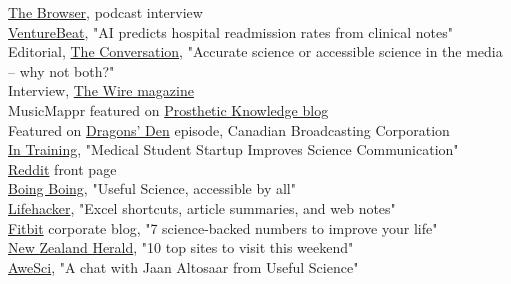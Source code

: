 \documentclass[4pt, letterpaper]{article}
\begin{document}
\href{https://radiobrowser.libsyn.com/browser-conversations-katy-gero-and-jaan-altosaar}{The Browser}, podcast interview\\
\href{https://venturebeat.com/2019/04/11/ai-predicts-hospital-readmission-rates-from-clinical-notes/}{VentureBeat}, "AI predicts hospital readmission rates from clinical notes"\\
Editorial, \href{https://theconversation.com/accurate-science-or-accessible-science-in-the-media-why-not-both-59871}{The Conversation}, "Accurate science or accessible science in the media – why not both?" \\
Interview, \href{http://www.thewire.co.uk/in-writing/interviews/play-the-musicmappr-sampling-app}{The Wire magazine}\\
MusicMappr featured on \href{http://prostheticknowledge.tumblr.com/post/139503874331/musicmappr-online-app-by-ethan-benjamin-analyzes-a}{Prosthetic Knowledge blog} \\
Featured on \href{http://www.cbc.ca/dragonsden/nextgenden/season1/next-gen-den-5}{Dragons' Den} episode, Canadian Broadcasting Corporation\\ %
\href{http://in-training.org/useful-science-medical-student-startup-improves-science-communication-9431}{In Training}, "Medical Student Startup Improves Science Communication"\\
\href{http://www.reddit.com/r/science/comments/2kbol2/commuters_became_happier_after_engaging_in/}{Reddit} front page\\
\href{http://boingboing.net/2014/01/22/useful-science-accessible-by.html}{Boing Boing}, "Useful Science, accessible by all"\\
\href{http://lifehacker.com/excel-shortcuts-article-summaries-and-web-notes-1506962447}{Lifehacker}, "Excel shortcuts, article summaries, and web notes"\\
\href{https://web.archive.org/web/20150907214517/https://blog.fitbit.com/7-science-backed-numbers-to-improve-your-life/}{Fitbit} corporate blog, "7 science-backed numbers to improve your life"\\
\href{http://www.nzherald.co.nz/technology/news/article.cfm?c_id=5&objectid=11256302}{New Zealand Herald}, "10 top sites to visit this weekend"\\
\href{http://awesci.com/chat-jaan-altosaar-useful-science/}{AweSci}, "A chat with Jaan Altosaar from Useful Science"\\
\end{document}
